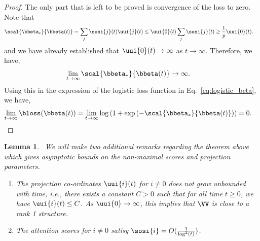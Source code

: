 \documentclass{article}
\theoremstyle{plain}
\newtheorem{lemma}[theorem]{Lemma}
\theoremstyle{definition}
\theoremstyle{remark}
\begin{document}
\begin{proof}
The only part that is left to be proved is convergence of the loss to zero. 
Note that 
\begin{align*}
    \scal{\bbeta_*}{\bbeta(t)} &= \sum_{j} \sosi{j}(t) \uui{j}(t) \leq \uui{0}(t) \sum_{j} \sosi{j}(t) \geq \frac{1}{p} \uui{0}(t).
\end{align*}
and we have already established that $\uui{0}(t) \to \infty$ as $t \to \infty$. Therefore, we have,
\begin{align*}
    \lim_{t \to \infty} \scal{\bbeta_*}{\bbeta(t)} &\to \infty.
\end{align*}
Using this in the expression of the logistic loss function in Eq.~\eqref{eq:logistic_beta}, we have,
\begin{align*}
    \lim_{t \to \infty} \bloss(\bbeta(t)) &= \lim_{t \to \infty} \log \left( 1 + \exp\left( -  \scal{\bbeta_*}{\bbeta(t)}  \right) \right) = 0.
\end{align*}    
\end{proof}

\begin{lemma}~\label{lem:log-non-maximal-rates} We will make two additional remarks regarding the theorem above which gives asymptotic bounds on the non-maximal scores and projection parameters. 
\begin{enumerate}[label=(\alph*)]
    \item The projection co-ordinates $\uui{i}(t)$ for $i \neq 0$ does not grow unbounded with time, i.e., there exists a constant $C > 0$ such that for all time $t \geq 0$, we have $\uui{i}(t) \leq C$. As $\uui{0} \to \infty$, this implies that $\VV$ is close to a rank 1 structure. 
    \item The attention scores for $i \neq 0$ satisy $\sosi{i} = O(\frac{1}{\log^2 (t)})$. 
\end{enumerate}
\end{lemma}    
\end{document}
